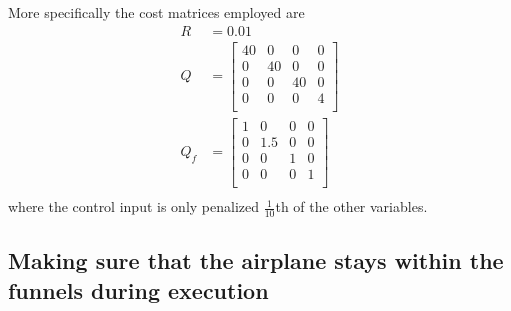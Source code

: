 More specifically the cost matrices employed are
\begin{align*}
  R &= 0.01 \\
  Q &= \begin{bmatrix}
    40 & 0 & 0 & 0 \\
    0 & 40 & 0 & 0 \\
    0 & 0 & 40 & 0 \\
    0 & 0 & 0 & 4 \\
  \end{bmatrix}
  \\
  Q_{f} &=
          \begin{bmatrix}
            1 & 0 & 0 & 0 \\
            0 & 1.5 & 0 & 0 \\
            0 & 0 & 1 & 0 \\
            0 & 0 & 0 & 1 \\
          \end{bmatrix}
  \\
\end{align*}
where the control input is only penalized \(\frac{1}{10}\)th of the other
variables.

\subsection{Making sure that the airplane stays within the funnels during
  execution}
\label{subsec:check-vehicle-in-funnel}

